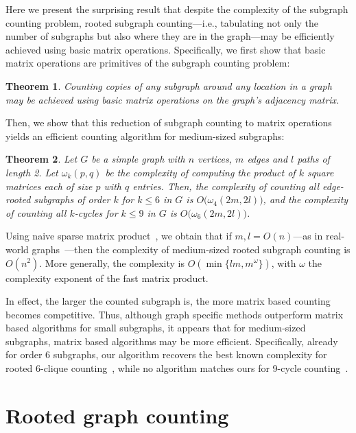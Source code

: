 \documentclass{article}
\theoremstyle{plain}
\newtheorem{Theorem}{Theorem}
\begin{document}
Here we present the surprising result that despite the complexity of the subgraph counting problem, rooted subgraph counting---i.e., tabulating not only the number of subgraphs but also where they are in the graph---may be efficiently achieved using basic matrix operations. Specifically, we first show that basic matrix operations are primitives of the subgraph counting problem:
%
\begin{Theorem}\label{thm1}\vspace{-.25\baselineskip}
Counting copies of any subgraph around any location in a graph may be achieved using basic matrix operations on the graph's adjacency matrix.\vspace{-.33\baselineskip}
\end{Theorem}
%
Then, we show that this reduction of subgraph counting to matrix operations yields an efficient counting algorithm for medium-sized subgraphs:
%
\begin{Theorem}\label{thm2}\vspace{-.25\baselineskip}
Let $G$ be a simple graph with $n$ vertices, $m$ edges and $l$ paths of length 2. Let $\omega_k(p,q)$ be the complexity of computing the product of $k$ square matrices each of size $p$ with $q$ entries. Then, the complexity of counting all edge-rooted subgraphs of order $k$ for $k\leq 6$ in $G$ is $O\big(\omega_4(2m,2l)\big)$, and the complexity of counting all $k$-cycles for $k\leq 9$ in $G$ is $O\big(\omega_6(2m,2l)\big)$.\vspace{-.33\baselineskip}
\end{Theorem}
%
Using naive sparse matrix product~\cite{yuster2005fast}, we obtain that if $m,l=O(n)$---as in real-world graphs~\cite{Barabasi99,clauset2009power}---then the complexity of medium-sized rooted subgraph counting is $O(n^2)$. More generally, the complexity is $O(\min\{lm,m^\omega\})$, with $\omega$ the complexity exponent of the fast matrix product.

In effect, the larger the counted subgraph is, the more matrix based counting becomes competitive. Thus, although graph specific methods outperform matrix based algorithms for small subgraphs, it appears that for medium-sized subgraphs, matrix based algorithms may be more efficient. Specifically, already for order 6 subgraphs, our algorithm recovers the best known complexity for rooted 6-clique counting~\cite{eisenbrand2004complexity}, while no algorithm matches ours for 9-cycle counting~\cite{alon1997cycles}.

\section{Rooted graph counting}\label{Roots}
\end{document}
